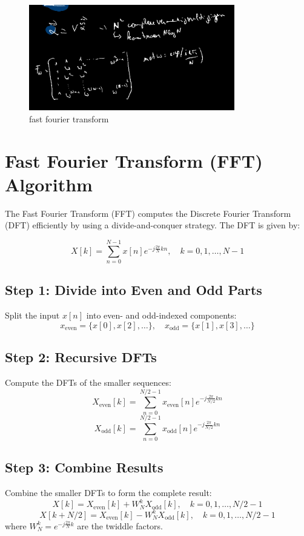 \documentclass[a4paper]{report}
\begin{document}
\begin{figure}[H]
	\centering
	\includegraphics[width=0.8\textwidth]{assets/ffty.png}
	\caption{fast fourier transform}
	\label{fig:ffty}
\end{figure}

\section*{Fast Fourier Transform (FFT) Algorithm}

The Fast Fourier Transform (FFT) computes the Discrete Fourier Transform (DFT) efficiently by using a divide-and-conquer strategy. The DFT is given by:

\[
	X[k] = \sum_{n=0}^{N-1} x[n] e^{-j \frac{2\pi}{N} kn}, \quad k = 0, 1, \dots, N-1
\]

\subsection*{Step 1: Divide into Even and Odd Parts}
Split the input \( x[n] \) into even- and odd-indexed components:
\[
	x_{\text{even}} = \{x[0], x[2], \dots\}, \quad x_{\text{odd}} = \{x[1], x[3], \dots\}
\]

\subsection*{Step 2: Recursive DFTs}
Compute the DFTs of the smaller sequences:
\[
	X_{\text{even}}[k] = \sum_{n=0}^{N/2-1} x_{\text{even}}[n] e^{-j \frac{2\pi}{N/2} kn}
\]
\[
	X_{\text{odd}}[k] = \sum_{n=0}^{N/2-1} x_{\text{odd}}[n] e^{-j \frac{2\pi}{N/2} kn}
\]

\subsection*{Step 3: Combine Results}
Combine the smaller DFTs to form the complete result:
\[
	X[k] = X_{\text{even}}[k] + W_N^k X_{\text{odd}}[k], \quad k = 0, 1, \dots, N/2-1
\]
\[
	X[k+N/2] = X_{\text{even}}[k] - W_N^k X_{\text{odd}}[k], \quad k = 0, 1, \dots, N/2-1
\]
where \( W_N^k = e^{-j \frac{2\pi}{N} k} \) are the twiddle factors.
\end{document}
